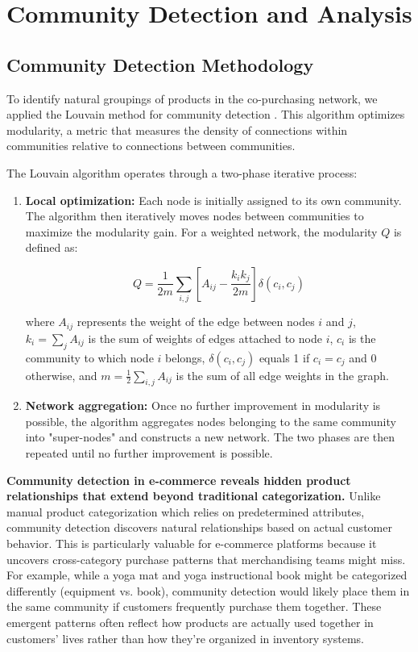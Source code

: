 \documentclass[conference]{IEEEtran}
\begin{document}
\section{Community Detection and Analysis}
\subsection{Community Detection Methodology}
To identify natural groupings of products in the co-purchasing network, we applied the Louvain method for community detection \cite{blondel2008fast}. This algorithm optimizes modularity, a metric that measures the density of connections within communities relative to connections between communities.

The Louvain algorithm operates through a two-phase iterative process:
\begin{enumerate}
    \item \textbf{Local optimization:} Each node is initially assigned to its own community. The algorithm then iteratively moves nodes between communities to maximize the modularity gain. For a weighted network, the modularity $Q$ is defined as:
    
    \begin{equation}
    Q = \frac{1}{2m}\sum_{i,j} \left[ A_{ij} - \frac{k_i k_j}{2m} \right] \delta(c_i, c_j)
    \end{equation}
    
    where $A_{ij}$ represents the weight of the edge between nodes $i$ and $j$, $k_i = \sum_j A_{ij}$ is the sum of weights of edges attached to node $i$, $c_i$ is the community to which node $i$ belongs, $\delta(c_i, c_j)$ equals 1 if $c_i = c_j$ and 0 otherwise, and $m = \frac{1}{2}\sum_{i,j} A_{ij}$ is the sum of all edge weights in the graph.
    
    \item \textbf{Network aggregation:} Once no further improvement in modularity is possible, the algorithm aggregates nodes belonging to the same community into "super-nodes" and constructs a new network. The two phases are then repeated until no further improvement is possible.
\end{enumerate}

\textbf{Community detection in e-commerce reveals hidden product relationships that extend beyond traditional categorization.} Unlike manual product categorization which relies on predetermined attributes, community detection discovers natural relationships based on actual customer behavior. This is particularly valuable for e-commerce platforms because it uncovers cross-category purchase patterns that merchandising teams might miss. For example, while a yoga mat and yoga instructional book might be categorized differently (equipment vs. book), community detection would likely place them in the same community if customers frequently purchase them together. These emergent patterns often reflect how products are actually used together in customers' lives rather than how they're organized in inventory systems.
\end{document}
